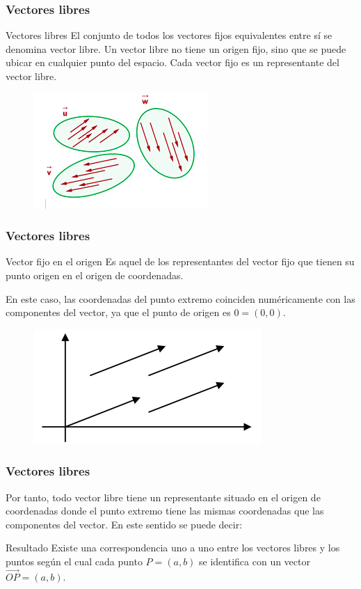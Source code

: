 \documentclass{beamer}
\begin{document}
\begin{frame}
  \frametitle{Vectores libres}


  \begin{block}{Vectores libres}
El conjunto de todos los vectores fijos equivalentes entre s\'i se denomina vector libre. Un vector libre no tiene un origen fijo, sino que se puede ubicar en cualquier punto del espacio. Cada vector fijo es un representante del vector libre.
\end{block}

\begin{figure}[h]
    \label{fig:vector libre}
\centering
\includegraphics[scale = 0.6]{vector_lliure}
\end{figure}

\end{frame}


\begin{frame}
  \frametitle{Vectores libres}
  \begin{block}{Vector fijo en el origen}
Es aquel de los representantes del vector fijo que tienen su punto origen en el origen de coordenadas.
\end{block}
En este caso, las coordenadas del punto extremo coinciden num\'ericamente con las componentes del vector, ya que el punto de origen es $0=(0,0)$.
\begin{figure}[h]
    \label{fig:vector libre en el origen}
\centering
\includegraphics[scale = 0.6]{vec_lliure_origin}
\end{figure}

\end{frame}


\begin{frame}
  \frametitle{Vectores libres}
  
  Por tanto, todo vector libre tiene un representante situado en el origen de coordenadas donde el punto extremo tiene las mismas coordenadas que las componentes del vector. En este sentido se puede decir:
  \begin{block}{Resultado}
Existe una correspondencia uno a uno entre los vectores libres y los puntos seg\'un el cual cada punto $P=(a,b)$ se identifica con un vector $\vec{OP} = (a,b)$.
 \end{block}
\end{frame}
\end{document}
